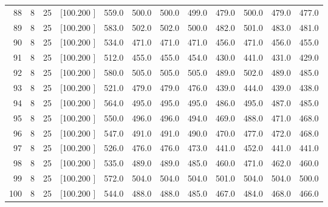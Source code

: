 \documentclass[12pt,a4paper]{article}
\begin{document}
\begin{center}
{\begin{tabular}{r r r r r r r r r r r r}
  88&  8& 25&[100.200   ]&   559.0&   500.0&   500.0&   499.0&   479.0&   500.0&   479.0&   477.0\\[-0.02in]
  89&  8& 25&[100.200   ]&   583.0&   502.0&   502.0&   500.0&   482.0&   501.0&   483.0&   481.0\\[-0.02in]
  90&  8& 25&[100.200   ]&   534.0&   471.0&   471.0&   471.0&   456.0&   471.0&   456.0&   455.0\\[-0.02in]
  91&  8& 25&[100.200   ]&   512.0&   455.0&   455.0&   454.0&   430.0&   441.0&   431.0&   429.0\\[-0.02in]
  92&  8& 25&[100.200   ]&   580.0&   505.0&   505.0&   505.0&   489.0&   502.0&   489.0&   485.0\\[-0.02in]
  93&  8& 25&[100.200   ]&   521.0&   479.0&   479.0&   476.0&   439.0&   444.0&   439.0&   438.0\\[-0.02in]
  94&  8& 25&[100.200   ]&   564.0&   495.0&   495.0&   495.0&   486.0&   495.0&   487.0&   485.0\\[-0.02in]
  95&  8& 25&[100.200   ]&   550.0&   496.0&   496.0&   494.0&   469.0&   488.0&   471.0&   468.0\\[-0.02in]
  96&  8& 25&[100.200   ]&   547.0&   491.0&   491.0&   490.0&   470.0&   477.0&   472.0&   468.0\\[-0.02in]
  97&  8& 25&[100.200   ]&   526.0&   476.0&   476.0&   473.0&   441.0&   452.0&   441.0&   441.0\\[-0.02in]
  98&  8& 25&[100.200   ]&   535.0&   489.0&   489.0&   485.0&   460.0&   471.0&   462.0&   460.0\\[-0.02in]
  99&  8& 25&[100.200   ]&   572.0&   504.0&   504.0&   504.0&   501.0&   504.0&   504.0&   500.0\\[-0.02in]
 100&  8& 25&[100.200   ]&   544.0&   488.0&   488.0&   485.0&   467.0&   484.0&   468.0&   466.0\\[-0.02in]

\hline
\end{tabular}}
\end{center}
\end{document}
